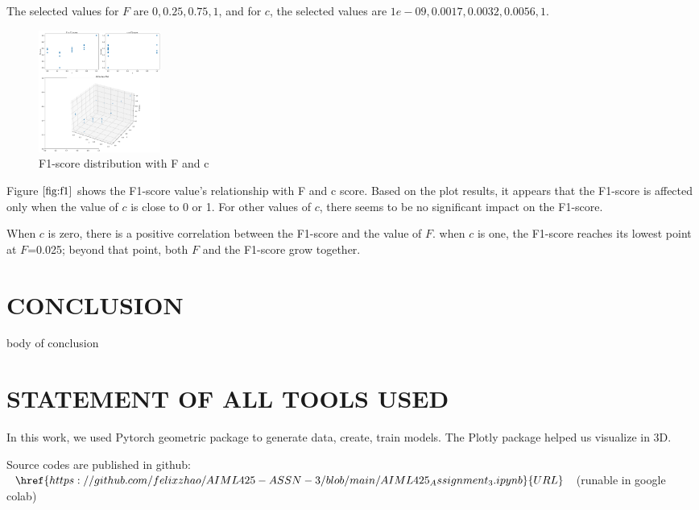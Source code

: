\documentclass{article}
\begin{document}
  The selected values for $F$ are $0, 0.25, 0.75, 1$, and for $c$, the selected values are $1e-09, 0.0017, 0.0032, 0.0056, 1$.
  
  \begin{figure}[htb]

    \begin{minipage}[b]{1.0\linewidth}
      \centering
      \centerline{\includegraphics[width=4.0cm]{images/F_c_f1}}
    \end{minipage}
    \caption{F1-score distribution with F and c}
    \label{fig:f1}
    \end{figure}


Figure $\ref{fig:f1}$ shows the F1-score value's relationship with F and c score.
Based on the plot results, it appears that the F1-score is affected only when the value of $c$ is close to 0 or 1. For other values of $c$, there seems to be no significant impact on the F1-score.

When $c$ is zero, there is a positive correlation between the F1-score and the value of $F$.
when $c$ is one, the F1-score reaches its lowest point at 
$F$=0.025; beyond that point, both $F$ and the F1-score grow together.

\section{CONCLUSION}
\label{sec:conclusion}

body of conclusion

\section{STATEMENT OF ALL TOOLS USED}
\label{sec:statementofalltoolsused}

In this work, we used Pytorch geometric package to generate data, create, train models. 
The Plotly package helped us visualize in 3D. 

Source codes are published in github: 
$\href{https://github.com/felixzhao/AIML425-ASSN-3/blob/main/AIML425_Assignment_3.ipynb}{URL}$
 (runable in google colab)
\end{document}
